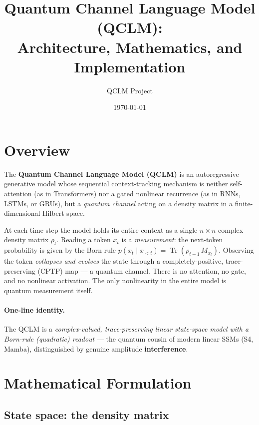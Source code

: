 \documentclass[11pt,a4paper]{article}
\title{\textbf{Quantum Channel Language Model (QCLM):\\
Architecture, Mathematics, and Implementation}}
\author{QCLM Project}
\date{\today}
\newcommand{\Tr}{\operatorname{Tr}}
\theoremstyle{plain}
\begin{document}
\maketitle
\tableofcontents
\bigskip

\section{Overview}

The \textbf{Quantum Channel Language Model (QCLM)} is an autoregressive
generative model whose sequential context-tracking mechanism is neither
self-attention (as in Transformers) nor a gated nonlinear recurrence (as in
RNNs, LSTMs, or GRUs), but a \emph{quantum channel} acting on a density
matrix in a finite-dimensional Hilbert space.

At each time step the model holds its entire context as a single
$n\times n$ complex density matrix $\rho_t$. Reading a token $x_t$ is
a \emph{measurement}: the next-token probability is given by the Born
rule $p(x_t \mid x_{<t}) = \Tr(\rho_{t-1}\, M_{x_t})$. Observing the
token \emph{collapses and evolves} the state through a
completely-positive, trace-preserving (CPTP) map --- a quantum channel.
There is no attention, no gate, and no nonlinear activation. The only
nonlinearity in the entire model is quantum measurement itself.

\paragraph{One-line identity.}
The QCLM is a \emph{complex-valued, trace-preserving linear state-space
model with a Born-rule (quadratic) readout} --- the quantum cousin of
modern linear SSMs (S4, Mamba), distinguished by genuine amplitude
\textbf{interference}.

\section{Mathematical Formulation}

\subsection{State space: the density matrix}
\end{document}
